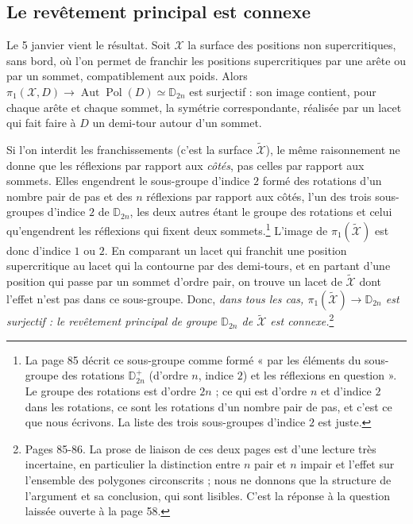 \documentclass[11pt,a4paper]{article}
\begin{document}
\subsection*{Le revêtement principal est connexe}

Le 5 janvier vient le résultat. Soit $\mathcal{X}$ la surface des positions non
supercritiques, sans bord, où l'on permet de franchir les positions
supercritiques par une arête ou par un sommet, compatiblement aux poids. Alors
$\pi_1(\mathcal{X}, D) \to \operatorname{Aut}\operatorname{Pol}(D) \simeq
\mathbb{D}_{2n}$ est surjectif : son image contient, pour chaque arête et chaque
sommet, la symétrie correspondante, réalisée par un lacet qui fait faire à $D$
un demi-tour autour d'un sommet.

Si l'on interdit les franchissements (c'est la surface
$\widetilde{\mathcal{X}}$), le même raisonnement ne donne que les réflexions
par rapport aux \emph{côtés}, pas celles par rapport aux sommets. Elles
engendrent le sous-groupe d'indice $2$ formé des rotations d'un nombre pair de
pas et des $n$ réflexions par rapport aux côtés, l'un des trois sous-groupes
d'indice $2$ de $\mathbb{D}_{2n}$, les deux autres étant le groupe des rotations
et celui qu'engendrent les réflexions qui fixent deux sommets.\footnote{La page
85 décrit ce sous-groupe comme formé « par les éléments du sous-groupe des
rotations $\mathbb{D}^{+}_{2n}$ (d'ordre $n$, indice $2$) et les réflexions en
question ». Le groupe des rotations est d'ordre $2n$ ; ce qui est d'ordre $n$
et d'indice $2$ dans les rotations, ce sont les rotations d'un nombre pair de
pas, et c'est ce que nous écrivons. La liste des trois sous-groupes d'indice
$2$ est juste.} L'image de $\pi_1(\widetilde{\mathcal{X}})$ est donc d'indice $1$
ou $2$. En comparant un lacet qui franchit une position supercritique au lacet
qui la contourne par des demi-tours, et en partant d'une position qui passe par
un sommet d'ordre pair, on trouve un lacet de $\widetilde{\mathcal{X}}$ dont
l'effet n'est pas dans ce sous-groupe. Donc, \emph{dans tous les cas,
$\pi_1(\widetilde{\mathcal{X}}) \to \mathbb{D}_{2n}$ est surjectif : le
revêtement principal de groupe $\mathbb{D}_{2n}$ de $\widetilde{\mathcal{X}}$
est connexe.}\footnote{Pages 85-86. La prose de liaison de ces deux pages est
d'une lecture très incertaine, en particulier la distinction entre $n$ pair et
$n$ impair et l'effet sur l'ensemble des polygones circonscrits ; nous ne
donnons que la structure de l'argument et sa conclusion, qui sont lisibles.
C'est la réponse à la question laissée ouverte à la page 58.}
\end{document}
